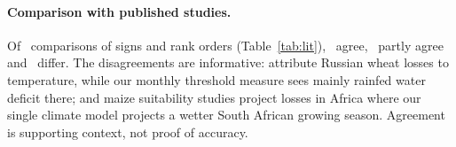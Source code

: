 \paragraph{Comparison with published studies.} Of \litN\ comparisons of signs and rank orders
(Table~\ref{tab:lit}), \litAgree\ agree, \litPartial\ partly agree and \litDiffer\ differ. The
disagreements are informative: \citet{lobell2011} attribute Russian wheat losses to temperature, while our
monthly threshold measure sees mainly rainfed water deficit there; and maize suitability studies
\citep{ramirez2017} project losses in Africa where our single climate model projects a wetter South African
growing season. Agreement is supporting context, not proof of accuracy.

\begin{table}[p]
\centering\scriptsize
\caption{Our results next to published findings.}\label{tab:lit}

\end{table}
